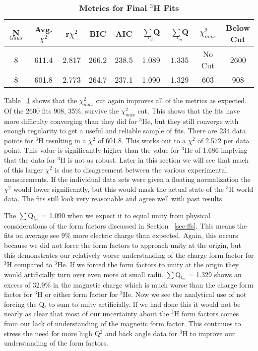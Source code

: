 \vspace{6mm}
\begin{table}[!h]
\centering
\begin{tabular}{|c c c c c c c c c|}
\hline
\textbf{N$_{Gaus}$} & \textbf{Avg. $\chi^2$} & \textbf{r$\chi^2$} & \textbf{BIC} & \textbf{AIC} & \textbf{$\sum$Q$_{i_{ch}}$} & \textbf{$\sum$Q$_{i_{m}}$} & \textbf{$\chi^2_{max}$} & \makecell{\textbf{Below}\\ \textbf{Cut}} \\
\hline
8 & 611.4 & 2.817 & 266.2 & 238.5 & 1.089 & 1.335 & No Cut & 2600\\
8 & 601.8 & 2.773 & 264.7 & 237.1 & 1.090 & 1.329 & 603 & 908\\
\hline
\end{tabular}
\caption{\bf{Metrics for Final $^3$H Fits}}
\label{tab:3h_fits}
\end{table}

Table ~\ref{tab:3h_fits} shows that the $\chi^2_{max}$ cut again improves all of the metrics as expected. Of the 2600 fits 908, 35$\%$, survive the $\chi^2_{max}$ cut. This shows that the fits have more difficulty converging than they did for $^3$He, but they still converge with enough regularity to get a useful and reliable sample of fits. There are 234 data points for $^3$H resulting in a $\chi^2$ of 601.8. This works out to a $\chi^2$ of 2.572 per data point. This value is significantly higher than the value for $^3$He of 1.686 implying that the data for $^3$H is not as robust. Later in this section we will see that much of this larger $\chi^2$ is due to disagreement between the various experimental measurements. If the individual data sets were given a floating normalization the $\chi^2$ would lower significantly, but this would mask the actual state of the $^3$H world data. The fits still look very reasonable and agree well with past results.%

The $\sum$Q$_{i_{ch}}$ = 1.090 when we expect it to equal unity from physical considerations of the form factors discussed in Section ~\ref{sec:ffs}. This means the fits on average see 9$\%$ more electric charge than expected. Again, this occurs because we did not force the form factors to approach unity at the origin, but this demonstrates our relatively worse understanding of the charge form factor for $^3$H compared to $^3$He. If we forced the form factors to unity at the origin they would artificially turn over even more at small radii. $\sum$Q$_{i_{m}}$ = 1.329 shows an excess of 32.9$\%$ in the magnetic charge which is much worse than the charge form factor for $^3$H or either form factor for $^3$He. Now we see the analytical use of not forcing the Q$_i$ to sum to unity artificially. If we had done this it would not be nearly as clear that most of our uncertainty about the $^3$H form factors comes from our lack of understanding of the magnetic form factor. This continues to stress the need for more high Q$^2$ and back angle data for $^3$H to improve our understanding of the form factors.%

